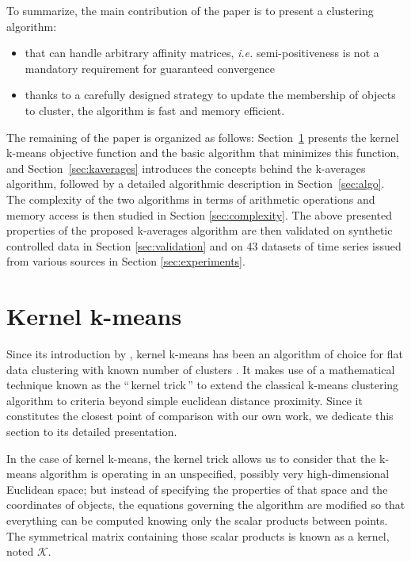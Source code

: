 \documentclass[natbib,smallextended]{svjour3}
\newcommand{\gl}[1]{``\,#1\,''} %
\begin{document}
To summarize, the main contribution of the paper is to present a clustering algorithm:
\begin{itemize}
  \item  that can handle arbitrary affinity matrices, \textit{i.e.} semi-positiveness is not a mandatory requirement for guaranteed convergence
  \item thanks to a carefully designed strategy to update the membership of objects to cluster, the algorithm is fast and memory efficient.
\end{itemize}

The remaining of the paper is organized as follows: Section~\ref{sec:kkmeans} presents the kernel k-means objective function and the basic algorithm that minimizes this function, and Section~\ref{sec:kaverages} introduces the concepts behind the k-averages algorithm,
followed by a detailed algorithmic description in Section~\ref{sec:algo}.
The complexity of the two algorithms in terms of arithmetic operations and memory access is then studied in Section \ref{sec:complexity}. The above presented properties of the proposed k-averages algorithm are then validated on synthetic controlled data in Section \ref{sec:validation} and on 43 datasets of time series issued from various sources in Section \ref{sec:experiments}.

\section{Kernel k-means} \label{sec:kkmeans}

Since its introduction by \citet{Girolami:2002:MKC:2325785.2326903}, kernel k-means has been an algorithm of choice for flat data clustering with known number of clusters \citep{Kulis2008, Roth:2003:OCP:960254.960291}. It makes use of a mathematical technique known as the \gl{kernel trick} to extend the classical k-means clustering algorithm \citep{macQueenBsmsp67} to criteria beyond simple euclidean distance proximity. Since it constitutes the closest point of comparison with our own work, we dedicate this section to its detailed presentation.

In the case of kernel k-means, the kernel trick allows us to  consider that the k-means algorithm is operating in an unspecified, possibly very high-dimensional Euclidean space; but instead of specifying the properties of that space and the coordinates of objects, the equations governing the algorithm are modified so that everything can be computed knowing only the scalar products between points. The symmetrical matrix  containing those scalar products is known as a kernel, noted $\mathcal{K}$.
\end{document}
